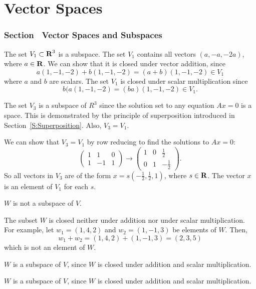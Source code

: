 \chapter{Vector Spaces}

\subsection*{Section~\protect{\ref{S:5.1}} Vector Spaces and Subspaces}

The set $V_1 \subset \mbox{$\bf{R}$}^3$ is a subspace.
The set $V_1$ contains all vectors $(a,-a,-2a)$,
where $a \in \mbox{$\bf{R}$}$.  We can show that it is closed under
vector addition, since
\[
a(1,-1,-2) + b(1,-1,-2) = (a + b)(1,-1,-2) \in V_1
\]
where $a$ and $b$ are scalars.  The set $V_1$ is closed under scalar
multiplication since
\[
b(a(1,-1,-2) = (ba)(1,-1,-2) \in V_1.
\]

The set $V_3$ is a subspace of $R^3$ since the solution set to
any equation $Ax = 0$ is a space.  This is demonstrated by the
principle of superposition introduced in Section~\ref{S:Superposition}.  
Also, $V_3 = V_1$.

\para   We can show that $V_3 = V_1$ by row reducing to find the
solutions to $Ax = 0$:
\[
\left(\begin{array}{rrr} 1 & 1 & 0 \\ 1 & -1 & 1
\end{array}\right) \longrightarrow \left(\begin{array}{rrr} 1 & 0 &
\frac{1}{2} \\ 0 & 1 & -\frac{1}{2} \end{array}\right).
\]
So all vectors in $V_3$ are of the form $x = s(-\frac{1}{2},
\frac{1}{2}, 1)$, where $s \in \mbox{$\bf{R}$}$.  The vector $x$ is an element
of $V_1$ for each $s$.

 \ans $W$ is not a subspace of $V$.

\soln The subset $W$ is closed neither under addition nor under scalar
multiplication.  For example, let $w_1 = (1,4,2)$ and $w_2 = (1,-1,3)$
be elements of $W$.  Then,
\[
w_1 + w_2 = (1,4,2) + (1,-1,3) = (2,3,5)
\]
which is not an element of $W$.

\newpage
{} $W$ is a subspace of $V$, since $W$ is closed under
addition and scalar multiplication.

 $W$ is a subspace of $V$, since $W$ is closed under
addition and scalar multiplication.

